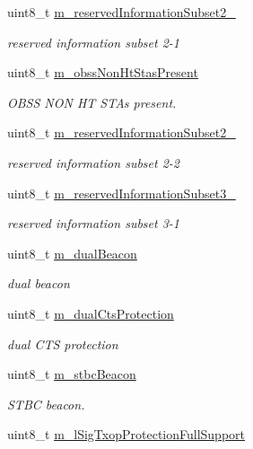 \begin{DoxyCompactItemize}
uint8\+\_\+t \hyperlink{classns3_1_1HtOperation_a92e7e8f82c294a90a405ef8ad2878e51}{m\+\_\+reserved\+Information\+Subset2\+\_}
\begin{DoxyCompactList}\small\item\em reserved information subset 2-\/1 \end{DoxyCompactList}\item 
uint8\+\_\+t \hyperlink{classns3_1_1HtOperation_a277ac5ed43d02f794722b25dc0ac4cd8}{m\+\_\+obss\+Non\+Ht\+Stas\+Present}
\begin{DoxyCompactList}\small\item\em O\+B\+SS N\+ON HT S\+T\+As present. \end{DoxyCompactList}\item 
uint8\+\_\+t \hyperlink{classns3_1_1HtOperation_ab809c53abe9b43680e10e0d1ad1be868}{m\+\_\+reserved\+Information\+Subset2\+\_}
\begin{DoxyCompactList}\small\item\em reserved information subset 2-\/2 \end{DoxyCompactList}\item 
uint8\+\_\+t \hyperlink{classns3_1_1HtOperation_a317336a2eb67611aeaa820cae128f578}{m\+\_\+reserved\+Information\+Subset3\+\_}
\begin{DoxyCompactList}\small\item\em reserved information subset 3-\/1 \end{DoxyCompactList}\item 
uint8\+\_\+t \hyperlink{classns3_1_1HtOperation_a97d1b5180429a163fae7e96b4d1064bc}{m\+\_\+dual\+Beacon}
\begin{DoxyCompactList}\small\item\em dual beacon \end{DoxyCompactList}\item 
uint8\+\_\+t \hyperlink{classns3_1_1HtOperation_aa6ea2c1dd5440e6a00aca5a28554550d}{m\+\_\+dual\+Cts\+Protection}
\begin{DoxyCompactList}\small\item\em dual C\+TS protection \end{DoxyCompactList}\item 
uint8\+\_\+t \hyperlink{classns3_1_1HtOperation_a31d69de639f2fbc3ab1bdc141ad14277}{m\+\_\+stbc\+Beacon}
\begin{DoxyCompactList}\small\item\em S\+T\+BC beacon. \end{DoxyCompactList}\item 
uint8\+\_\+t \hyperlink{classns3_1_1HtOperation_aa751e234fac83acfaec6468beb5b8fa6}{m\+\_\+l\+Sig\+Txop\+Protection\+Full\+Support}

\end{DoxyCompactItemize}
